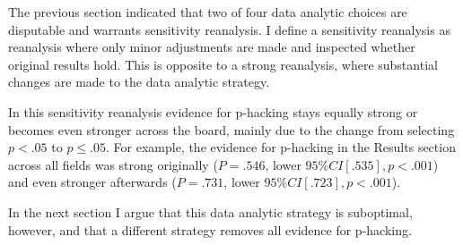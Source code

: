 The previous section indicated that two of four data analytic choices are disputable and warrants sensitivity reanalysis. I define a sensitivity reanalysis as reanalysis where only minor adjustments are made and inspected whether original results hold. This is opposite to a strong reanalysis, where substantial changes are made to the data analytic strategy.

In this sensitivity reanalysis evidence for p-hacking stays equally strong or becomes even stronger across the board, mainly due to the change from selecting $p<.05$ to $p\leq.05$. For example, the evidence for p-hacking in the Results section across all fields was strong originally ($P=.546$, lower $95\%CI [.535],p<.001$) and even stronger afterwards ($P=.731$, lower $95\%CI [.723], p<.001$).

In the next section I argue that this data analytic strategy is suboptimal, however, and that a different strategy removes all evidence for p-hacking.